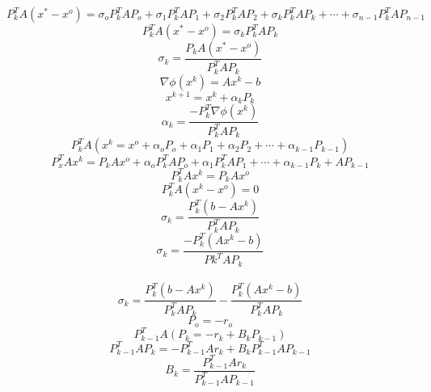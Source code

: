 \begin{displaymath}
P_k^TA(x^*-x^o)=\sigma_oP_k^TAP_o+\sigma_1P_k^TAP_1+\sigma_2P_k^TAP_2+\sigma_kP_k^TAP_k+\cdots+\sigma_{n-1}P_k^TAP_{n-1}
\end{displaymath}
\begin{displaymath}
P_k^TA(x^*-x^o)=\sigma_kP_k^TAP_k
\end{displaymath}
\begin{displaymath}
\boxed{\sigma_k=\frac{P_kA(x^*-x^o)}{P_k^TAP_k}}
\end{displaymath}
\begin{displaymath}
\nabla\phi(x^k)=Ax^k-b
\end{displaymath}
\begin{displaymath}
x^{k+1}=x^k+\alpha_kP_k
\end{displaymath}
\begin{displaymath}
\alpha_k=\frac{-P_k^T\nabla\phi(x^k)}{P_k^TAP_k}
\end{displaymath}
\begin{displaymath}
P_k^TA(x^k=x^o+\alpha_oP_o+\alpha_1P_1+\alpha_2P_2+\cdots+\alpha_{k-1}P_{k-1})
\end{displaymath}
\begin{displaymath}
P_x^TAx^k=P_kAx^o+\alpha_oP_k^TAP_o+\alpha_1P_k^TAP_1+\cdots+\alpha_{k-1}P_k+AP_{k-1}
\end{displaymath}
\begin{displaymath}
P_k^TAx^k=P_kAx^o
\end{displaymath}
\begin{displaymath}
P_k^TA(x^k-x^o)=0
\end{displaymath}
\begin{displaymath}
\sigma_k=\frac{P_k^T(b-Ax^k)}{P_k^TAP_k}
\end{displaymath}
\begin{displaymath}
\sigma_k=\frac{-P_k^T(Ax^k-b)}{Pk^TAP_k}
\end{displaymath}
\\
\begin{displaymath}
\sigma_k=\frac{P_k^T(b-Ax^k)}{P_k^TAP_k}-\frac{P_k^T(Ax^k-b)}{P_k^TAP_k}
\end{displaymath}
\begin{displaymath}
P_o=-r_o
\end{displaymath}
\begin{displaymath}
P_{k-1}^TA(P_k=-r_k+B_kP_{k-1})
\end{displaymath}
\begin{displaymath}
P_{k-1}^TAP_k=-P_{k-1}^TAr_k+B_kP_{k-1}^TAP_{k-1}
\end{displaymath}
\begin{displaymath}
B_k=\frac{P_{k-1}^TAr_k}{P_{k-1}^TAP_{k-1}}
\end{displaymath}


